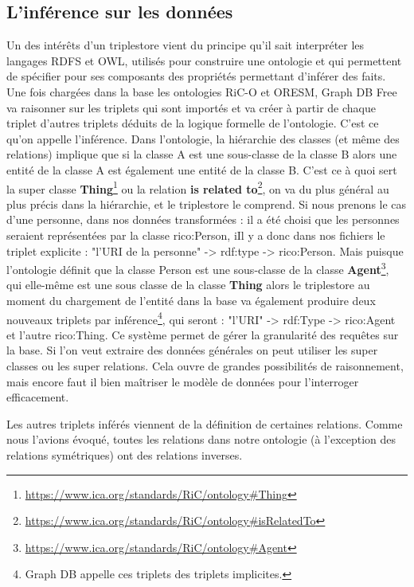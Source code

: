 \subsection{L'inférence sur les données}
Un des intérêts d'un triplestore vient du principe qu'il sait interpréter les langages RDFS et OWL, utilisés pour construire une ontologie et qui permettent de spécifier pour ses composants des propriétés permettant d'inférer des faits. Une fois chargées dans la base les ontologies RiC-O et ORESM, Graph DB Free va raisonner sur les triplets qui sont importés et va créer à partir de chaque triplet d'autres triplets déduits de la logique formelle de l'ontologie. C'est ce qu'on appelle l'inférence. Dans l'ontologie, la hiérarchie des classes (et même des relations) implique que si la classe A est une sous-classe de la classe B alors une entité de la classe A est également une entité de la classe B. C'est ce à quoi sert la super classe \textbf{Thing}\footnote{\href{https://www.ica.org/standards/RiC/ontology\#Thing}{https://www.ica.org/standards/RiC/ontology\#Thing}} ou la relation \textbf{is related to}\footnote{\href{https://www.ica.org/standards/RiC/ontology\#isRelatedTo}{https://www.ica.org/standards/RiC/ontology\#isRelatedTo}}, on va du plus général au plus précis dans la hiérarchie, et le triplestore le comprend. Si nous prenons le cas d'une personne, dans nos données transformées :  il a été choisi que les personnes seraient représentées par la classe rico:Person, iIl y a donc dans nos fichiers le triplet explicite : "l'URI de la personne" -> rdf:type -> rico:Person. Mais puisque l'ontologie définit que la classe Person est une sous-classe de la classe \textbf{Agent}\footnote{\href{https://www.ica.org/standards/RiC/ontology\#Agent}{https://www.ica.org/standards/RiC/ontology\#Agent}}, qui elle-même est une sous classe de la classe \textbf{Thing} alors le triplestore au moment du chargement de l'entité dans la base va également produire deux nouveaux triplets par inférence\footnote{Graph DB appelle ces triplets des triplets implicites.}, qui seront : "l'URI" -> rdf:Type -> rico:Agent et l'autre rico:Thing. Ce système permet de gérer la granularité des requêtes sur la base. Si l'on veut extraire des données générales on peut utiliser les super classes ou les super relations. Cela ouvre de grandes possibilités de raisonnement, mais encore faut il bien maîtriser le modèle de données pour l'interroger efficacement.
\par
Les autres triplets inférés viennent de la définition de certaines relations. Comme nous l'avions évoqué, toutes les relations dans notre ontologie (à l'exception des relations symétriques) ont des relations inverses.\par
